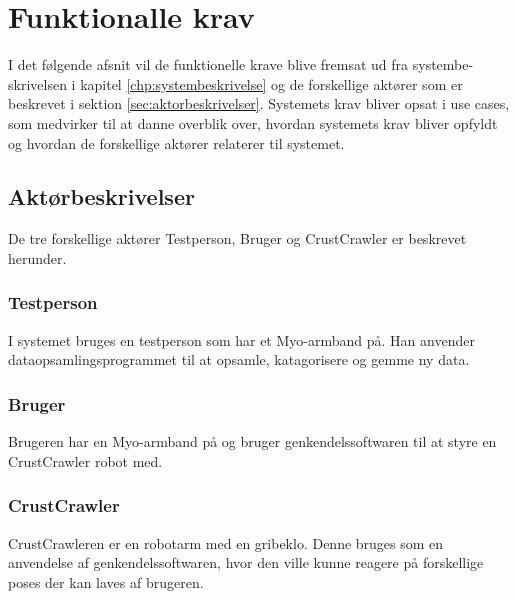 \thispagestyle{fancy}
\section{Funktionalle krav}
\label{sec:funktionellekrav}
I det følgende afsnit vil de funktionelle krave blive fremsat ud fra systembe- skrivelsen i kapitel \ref{chp:systembeskrivelse} og de forskellige aktører som er beskrevet i sektion \ref{sec:aktorbeskrivelser}.
Systemets krav bliver opsat i use cases, som medvirker til at danne overblik over, hvordan systemets krav bliver opfyldt og hvordan de forskellige aktører relaterer til systemet.

\subsection*{Aktørbeskrivelser}
\label{sec:aktorbeskrivelser}
De tre forskellige aktører Testperson, Bruger og CrustCrawler er beskrevet herunder.

\subsubsection{Testperson}
I systemet bruges en testperson som har et Myo-armband på. Han anvender dataopsamlingsprogrammet til at opsamle, katagorisere og gemme ny data.

\subsubsection{Bruger}
Brugeren har en Myo-armband på og bruger genkendelssoftwaren til at styre en CrustCrawler robot med.

\subsubsection{CrustCrawler}
CrustCrawleren er en robotarm med en gribeklo. Denne bruges som en anvendelse af genkendelssoftwaren, hvor den ville kunne reagere på forskellige poses der kan laves af brugeren.

